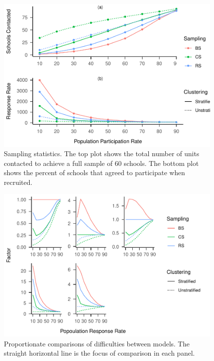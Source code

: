 \documentclass[man,floatsintext]{apa6}
\begin{document}
\begin{figure}
\centering
\includegraphics{GenSamp-Paper_files/figure-latex/fig-responses-1.pdf}
\caption{\label{fig:fig-responses}Sampling statistics. The top plot shows the total number of units contacted to achieve a full sample of 60 schools. The bottom plot shows the percent of schools that agreed to participate when recruited.}
\end{figure}



\begin{figure}
\centering
\includegraphics{GenSamp-Paper_files/figure-latex/fig-comp-1.pdf}
\caption{\label{fig:fig-comp}Proportionate comparisons of difficulties between models. The straight horizontal line is the focus of comparison in each panel.}
\end{figure}
\end{document}
